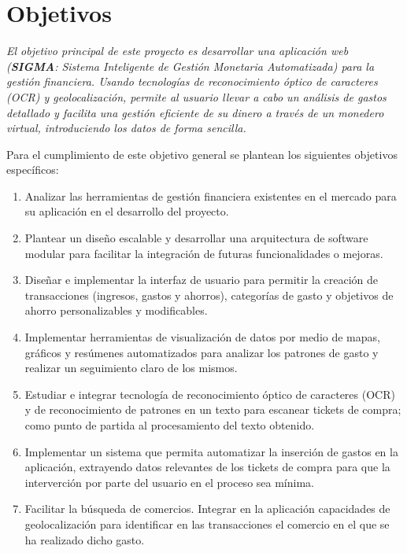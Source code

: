 \section{Objetivos} \label{sect:goals}
\textit{El objetivo principal de este proyecto es desarrollar una aplicación web (\textbf{SIGMA}: Sistema Inteligente de Gestión Monetaria Automatizada) 
para la gestión financiera. Usando tecnologías de reconocimiento
óptico de caracteres (OCR) y geolocalización, permite al usuario llevar a cabo un 
análisis de gastos detallado y facilita una gestión eficiente de su dinero
a través de un monedero virtual, introduciendo los datos de 
forma sencilla.}

Para el cumplimiento de este objetivo general se plantean los siguientes objetivos específicos:
\begin{enumerate}
    \item Analizar las herramientas de gestión financiera existentes en el mercado para su aplicación en el desarrollo del proyecto.  
    \item Plantear un diseño escalable y desarrollar una arquitectura de software modular para facilitar la integración de futuras funcionalidades o mejoras. 
    \item Diseñar e implementar la interfaz de usuario para permitir la creación 
         de transacciones (ingresos, gastos y ahorros), categorías de gasto y objetivos de ahorro personalizables y modificables.
    \item Implementar herramientas de visualización de datos por medio de mapas, gráficos y resúmenes automatizados para analizar los patrones de gasto y realizar un seguimiento claro de los mismos.
    \item Estudiar e integrar tecnología de reconocimiento óptico de caracteres (OCR) y de reconocimiento de patrones en un texto para escanear tickets de compra; como punto de partida al procesamiento del texto obtenido.
    \item Implementar un sistema que permita automatizar la inserción de gastos en la aplicación, extrayendo datos relevantes de los tickets de compra para que la interverción por parte del usuario en el proceso sea mínima.
    \item Facilitar la búsqueda de comercios. Integrar en la aplicación capacidades de geolocalización para identificar en las transacciones el comercio en el que se ha realizado dicho gasto.   
    
\end{enumerate}